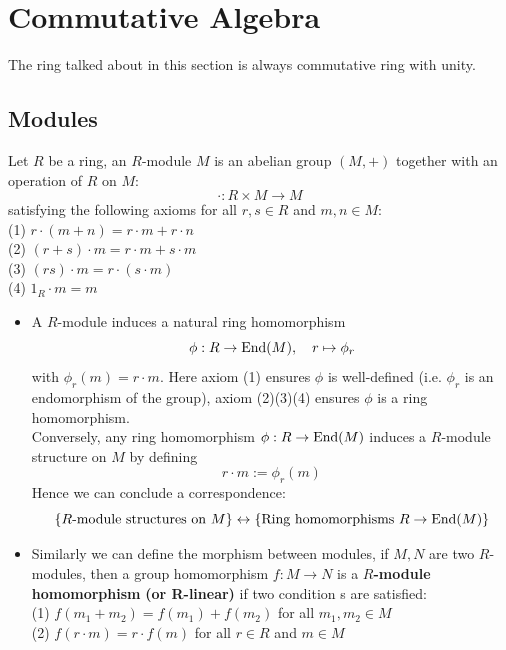 \documentclass[12pt,a4paper]{article}
\begin{document}
\newpage

\section{Commutative Algebra}

The ring talked about in this section is always commutative ring with unity.

\subsection{Modules}

\begin{definitionplain}
    Let \(R\) be a ring, an \(R\)-module \(M\) is an abelian group \((M,+)\) together with an operation of \(R\) on \(M\):
    \[\cdot: R \times M \to M\]
    satisfying the following axioms for all \(r,s \in R\) and \(m,n \in M\):\\
    (1) \(r \cdot (m+n) = r \cdot m + r \cdot n\) \\
    (2) \((r+s) \cdot m = r \cdot m + s \cdot m\) \\
    (3) \((rs) \cdot m = r \cdot (s \cdot m)\) \\
    (4) \(1_R \cdot m = m\) 
\end{definitionplain}

    \begin{itemize}
        \item   A \(R\)-module induces a natural ring homomorphism
    \[\phi: R \to \operatorname{End}(M), \quad  r \mapsto \phi_r\]
    with \(\phi_r(m) = r \cdot m\). Here axiom (1) ensures \(\phi\) is well-defined (i.e. \(\phi_r\) is an endomorphism of the group), axiom (2)(3)(4) ensures \(\phi\) is a ring homomorphism. \\

    Conversely, any ring homomorphism \(\phi: R \to \operatorname{End}(M)\) induces a \(R\)-module structure on \(M\) by defining
    \[r \cdot m := \phi_r(m)\]
    Hence we can conclude a correspondence:
    \[\{R\text{-module structures on } M\} \leftrightarrow \{ \text{Ring homomorphisms } R \to \operatorname{End}(M)\}    \]

    \item  Similarly we can define the morphism between modules, if \(M,N\) are two \(R\)-modules, then a group homomorphism \(f: M \to N\) is a \(R\)\textbf{-module homomorphism} \textbf{(or R-linear)} if two condition s are satisfied:\\
    (1) \(f(m_1 + m_2) = f(m_1) + f(m_2)\) for all \(m_1, m_2 \in M\)\\
    (2) \(f(r \cdot m) = r \cdot f(m)\) for all \(r \in R\) and \(m \in M\)\\
    \end{itemize}
\end{document}
